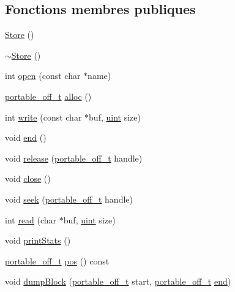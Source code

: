 \subsection*{Fonctions membres publiques}
\begin{DoxyCompactItemize}
\item 
\hyperlink{class_store_a5f58eadcb7385d5a5aa6830daef84f7d}{Store} ()
\item 
\hyperlink{class_store_a4fd725fdb2de0632ed98bfbd131c2512}{$\sim$\+Store} ()
\item 
int \hyperlink{class_store_a9707050019d12be2db8ea1b38d535f03}{open} (const char $\ast$name)
\item 
\hyperlink{portable_8h_a25423a5b429a3ee0610315d93938bd0b}{portable\+\_\+off\+\_\+t} \hyperlink{class_store_ac1ce3fb86b3bc46125756b9ef782c095}{alloc} ()
\item 
int \hyperlink{class_store_aec754c74cf190cb55281a923db21194a}{write} (const char $\ast$buf, \hyperlink{qglobal_8h_a4d3943ddea65db7163a58e6c7e8df95a}{uint} size)
\item 
void \hyperlink{class_store_a616a1f53fa04d39d505a03b1f49ab7a6}{end} ()
\item 
void \hyperlink{class_store_aed5b8a83aa15dfc3f7f1ca930a4d2583}{release} (\hyperlink{portable_8h_a25423a5b429a3ee0610315d93938bd0b}{portable\+\_\+off\+\_\+t} handle)
\item 
void \hyperlink{class_store_a1a3dd916ae5c4c2e6ca4d13f418344a9}{close} ()
\item 
void \hyperlink{class_store_ad77053023f371abfc70f76ee2a14c377}{seek} (\hyperlink{portable_8h_a25423a5b429a3ee0610315d93938bd0b}{portable\+\_\+off\+\_\+t} handle)
\item 
int \hyperlink{class_store_a02df7a98367838e436f8f8b3367016d1}{read} (char $\ast$buf, \hyperlink{qglobal_8h_a4d3943ddea65db7163a58e6c7e8df95a}{uint} size)
\item 
void \hyperlink{class_store_a3b1a8632a1a6180cbcf210a3bfe51698}{print\+Stats} ()
\item 
\hyperlink{portable_8h_a25423a5b429a3ee0610315d93938bd0b}{portable\+\_\+off\+\_\+t} \hyperlink{class_store_ad81d168e4f03617ee3e63a8c7fe58f5a}{pos} () const 
\item 
void \hyperlink{class_store_a1aa92a07ee209dcce2542a80aba174be}{dump\+Block} (\hyperlink{portable_8h_a25423a5b429a3ee0610315d93938bd0b}{portable\+\_\+off\+\_\+t} start, \hyperlink{portable_8h_a25423a5b429a3ee0610315d93938bd0b}{portable\+\_\+off\+\_\+t} \hyperlink{class_store_a616a1f53fa04d39d505a03b1f49ab7a6}{end})
\end{DoxyCompactItemize}


